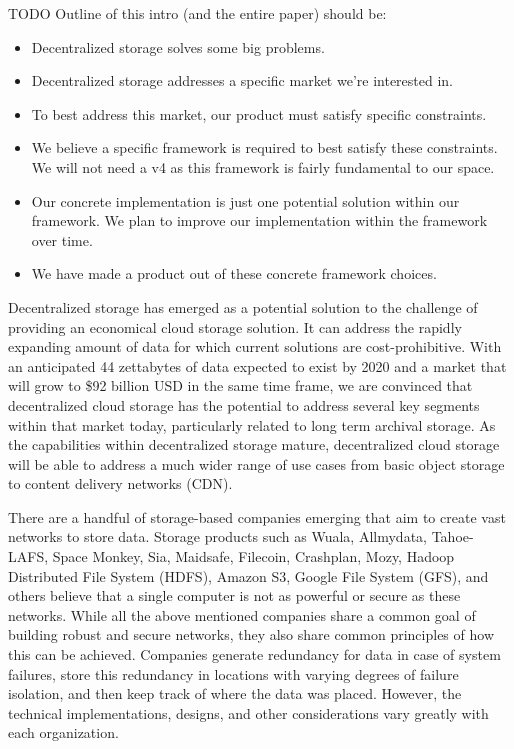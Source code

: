 \documentclass[11pt,fleqn,openany]{book}
\newcommand{\todo}[1]{{\color{red} TODO #1 }}
\begin{document}
\todo{
Outline of this intro (and the entire paper) should be:
\begin{itemize}
\item Decentralized storage solves some big problems.
\item Decentralized storage addresses a specific market we're interested in.
\item To best address this market, our product must satisfy specific constraints.
\item We believe a specific framework is required to best satisfy these
  constraints. We will not need a v4 as this framework is fairly fundamental
  to our space.
\item Our concrete implementation is just one potential solution within our
  framework. We plan to improve our implementation within the framework over
  time.
\item We have made a product out of these concrete framework choices.
\end{itemize}
}

Decentralized storage has emerged as a potential solution to the challenge of
providing an economical cloud storage solution. It can address the rapidly
expanding amount of data for which current solutions are cost-prohibitive.
With an anticipated 44 zettabytes of data expected to exist by 2020 and a
market that will grow to \$92 billion USD in the same time frame, we are
convinced that decentralized cloud storage has the potential to address several
key segments within that market today, particularly related to long term
archival storage.
As the capabilities within decentralized storage mature, decentralized cloud
storage will be able to address a much wider range of use cases from basic
object storage to content delivery networks (CDN).

There are a handful of storage-based companies emerging that aim to create vast
networks to store data.
Storage products such as Wuala, Allmydata, Tahoe-LAFS, Space Monkey, Sia,
Maidsafe, Filecoin, Crashplan, Mozy, Hadoop Distributed File System (HDFS),
Amazon S3, Google File System (GFS), and others believe that a single computer
is not as powerful or secure as these networks.
While all the above mentioned companies share a common goal of building robust
and secure networks, they also share common principles of how this can be
achieved.
Companies generate redundancy for data in case of system failures, store this
redundancy in locations with varying degrees of failure isolation, and then
keep track of where the data was placed.
However, the technical implementations, designs, and other considerations
vary greatly with each organization.
\end{document}

